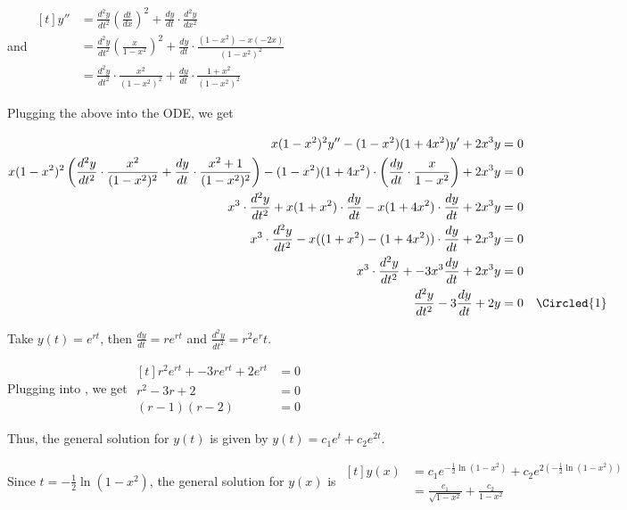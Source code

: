 \documentclass[11pt,fleqn]{book} %
\begin{document}
\begin{enumerate}
    and $\begin{aligned}[t]
        y'' & = \frac{d^2 y}{dt^2} \left( \frac{dt}{dx} \right)^2 + \frac{dy}{dt} \cdot \frac{d^2y}{dx^2}                          \\
            & = \frac{d^2 y}{dt^2} \left( \frac{x}{1 - x^2} \right)^2 + \frac{dy}{dt} \cdot \frac{(1 - x^2) - x(-2x)}{(1 - x^2)^2} \\
            & = \frac{d^2 y}{dt^2} \cdot \frac{x^2}{(1-x^2)^2} + \frac{dy}{dt} \cdot \frac{1+ x^2}{(1 - x^2)^2}
    \end{aligned}$

    Plugging the above into the ODE, we get 

    $\begin{aligned}[t]
        x(1-x^2)^2 y'' - (1-x^2)(1+4x^2)y' + 2x^3y & = 0 \\
        x(1-x^2)^2 \left( \frac{d^2 y}{dt^2} \cdot \frac{x^2}{(1-x^2)^2} + \frac{dy}{dt} \cdot \frac{x^2+1}{(1-x^2)^2} \right) - (1-x^2)(1+4x^2) \cdot \left( \frac{dy}{dt} \cdot \frac{x}{1-x^2} \right) + 2x^3y & = 0 \\
        x^3 \cdot \frac{d^2y}{dt^2} + x(1+x^2) \cdot \frac{dy}{dt} - x(1+4x^2) \cdot \frac{dy}{dt} + 2x^3y & = 0 \\
        x^3 \cdot \frac{d^2y}{dt^2} - x((1+x^2) - (1+4x^2)) \cdot \frac{dy}{dt} + 2x^3y & = 0 \\
        x^3 \cdot \frac{d^2y}{dt^2} + -3x^3 \frac{dy}{dt} + 2x^3y & = 0 \\
        \frac{d^2y}{dt^2} - 3\frac{dy}{dt} + 2y & = 0 & \Circled{1}
    \end{aligned}$

    Take $y(t) = e^{rt}$, then $\frac{dy}{dt} = re^{rt}$ and $\frac{d^2y}{dt^2} = r^2e^rt$. 

    Plugging into , we get $\begin{aligned}[t]
        r^2e^{rt} + -3re^{rt} + 2e^{rt} & = 0 \\
        r^2 - 3r + 2 & = 0 \\
        (r-1)(r-2)   & = 0
    \end{aligned}$

    Thus, the general solution for $y(t)$ is given by $y(t) = c_1 e^t + c_2 e^{2t}$. 

    Since $t = -\frac{1}{2}\ln(1-x^2)$, the general solution for $y(x)$ is $\begin{aligned}[t]
        y(x) & = c_1 e^{-\frac{1}{2}\ln(1-x^2)} + c_2 e^{2(-\frac{1}{2}\ln(1-x^2))} \\
             & = \frac{c_1}{\sqrt{1 - x^2}} + \frac{c_2}{1 - x^2}
    \end{aligned}$
\end{enumerate}
\end{document}
